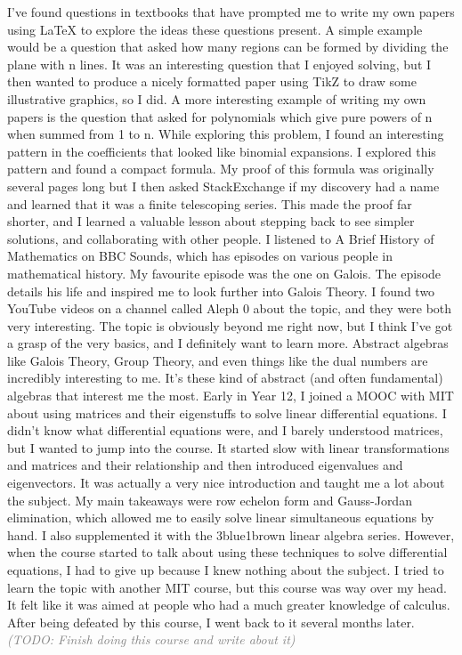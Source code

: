 \documentclass[a4paper, 12pt]{article}
\newcommand{\todo}[1]{\textsl{\textcolor{gray}{(TODO: #1)}}}
\newenvironment{personalstatement}{\directlua{startPersonalStatement()}}{\directlua{stopPersonalStatement()}}
\begin{document}
\begin{personalstatement}
I've found questions in textbooks that have prompted me to write my own papers using LaTeX to explore the ideas these questions present. A simple example would be a question that asked how many regions can be formed by dividing the plane with n lines. It was an interesting question that I enjoyed solving, but I then wanted to produce a nicely formatted paper using TikZ to draw some illustrative graphics, so I did. A more interesting example of writing my own papers is the question that asked for polynomials which give pure powers of n when summed from 1 to n. While exploring this problem, I found an interesting pattern in the coefficients that looked like binomial expansions. I explored this pattern and found a compact formula. My proof of this formula was originally several pages long but I then asked StackExchange if my discovery had a name and learned that it was a finite telescoping series. This made the proof far shorter, and I learned a valuable lesson about stepping back to see simpler solutions, and collaborating with other people.
I listened to A Brief History of Mathematics on BBC Sounds, which has episodes on various people in mathematical history. My favourite episode was the one on Galois. The episode details his life and inspired me to look further into Galois Theory. I found two YouTube videos on a channel called Aleph 0 about the topic, and they were both very interesting. The topic is obviously beyond me right now, but I think I've got a grasp of the very basics, and I definitely want to learn more. Abstract algebras like Galois Theory, Group Theory, and even things like the dual numbers are incredibly interesting to me. It's these kind of abstract (and often fundamental) algebras that interest me the most.
Early in Year 12, I joined a MOOC with MIT about using matrices and their eigenstuffs to solve linear differential equations. I didn't know what differential equations were, and I barely understood matrices, but I wanted to jump into the course. It started slow with linear transformations and matrices and their relationship and then introduced eigenvalues and eigenvectors. It was actually a very nice introduction and taught me a lot about the subject. My main takeaways were row echelon form and Gauss-Jordan elimination, which allowed me to easily solve linear simultaneous equations by hand. I also supplemented it with the 3blue1brown linear algebra series. However, when the course started to talk about using these techniques to solve differential equations, I had to give up because I knew nothing about the subject. I tried to learn the topic with another MIT course, but this course was way over my head. It felt like it was aimed at people who had a much greater knowledge of calculus. After being defeated by this course, I went back to it several months later. \todo{Finish doing this course and write about it}

\end{personalstatement}
\end{document}
